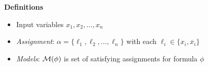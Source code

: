 \documentclass[t,pdf]{beamer}
\newcommand{\oneg}[1]{\overline{#1}}
\newcommand{\xnot}{\oneg{x}}
\begin{document}
\begin{frame}
\medskip
{\bf Definitions}
\begin{itemize}
  \item Input variables $x_1, x_2, \ldots, x_n$
  \item {\em Assignment}: $\alpha = \{ \ell_1, \ell_2, \ldots, \ell_n \}$ with each $\ell_i \in \{x_i, \xnot_i\}$
  \item {\em Models}: ${\cal M}(\phi)$ is set of satisfying assignments for formula $\phi$
\end{itemize}

\medskip
{}

  
\end{frame}
\end{document}
